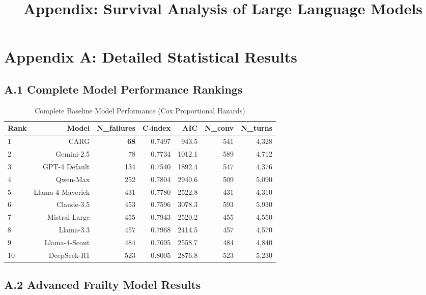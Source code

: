 \documentclass[letterpaper]{article}
\title{Appendix: Survival Analysis of Large Language Models}
\begin{document}
\section*{Appendix A: Detailed Statistical Results}

\subsection*{A.1 Complete Model Performance Rankings}

\begin{table}[ht]
\centering
\caption{Complete Baseline Model Performance (Cox Proportional Hazards)}
\label{tab:complete_baseline}
\begin{tabular}{lrrrrrr}
\toprule
\textbf{Rank} & \textbf{Model} & \textbf{N\_failures} & \textbf{C-index} & \textbf{AIC} & \textbf{N\_conv} & \textbf{N\_turns} \\
\midrule
1 & CARG & \textbf{68} & 0.7497 & 943.5 & 541 & 4,328 \\
2 & Gemini-2.5 & 78 & 0.7734 & 1012.1 & 589 & 4,712 \\
3 & GPT-4 Default & 134 & 0.7540 & 1892.4 & 547 & 4,376 \\
4 & Qwen-Max & 252 & 0.7804 & 2940.6 & 509 & 5,090 \\
5 & Llama-4-Maverick & 431 & 0.7780 & 2522.8 & 431 & 4,310 \\
6 & Claude-3.5 & 453 & 0.7596 & 3078.3 & 593 & 5,930 \\
7 & Mistral-Large & 455 & 0.7943 & 2520.2 & 455 & 4,550 \\
8 & Llama-3.3 & 457 & 0.7968 & 2414.5 & 457 & 4,570 \\
9 & Llama-4-Scout & 484 & 0.7695 & 2558.7 & 484 & 4,840 \\
10 & DeepSeek-R1 & 523 & 0.8005 & 2876.8 & 523 & 5,230 \\
\bottomrule
\end{tabular}
\end{table}

\subsection*{A.2 Advanced Frailty Model Results}
\end{document}
